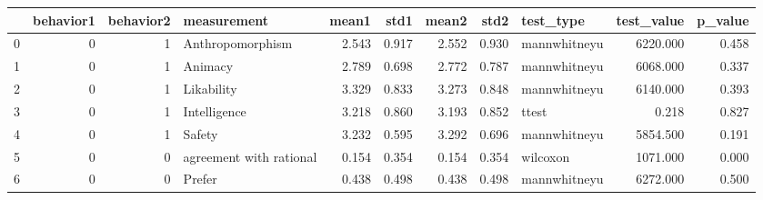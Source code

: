 \begin{tabular}{lrrlrrrrlrr}
\toprule
{} &  behavior1 &  behavior2 &              measurement &  mean1 &   std1 &  mean2 &   std2 &     test\_type &  test\_value &  p\_value \\
\midrule
0 &          0 &          1 &         Anthropomorphism &  2.543 &  0.917 &  2.552 &  0.930 &  mannwhitneyu &    6220.000 &    0.458 \\
1 &          0 &          1 &                  Animacy &  2.789 &  0.698 &  2.772 &  0.787 &  mannwhitneyu &    6068.000 &    0.337 \\
2 &          0 &          1 &               Likability &  3.329 &  0.833 &  3.273 &  0.848 &  mannwhitneyu &    6140.000 &    0.393 \\
3 &          0 &          1 &             Intelligence &  3.218 &  0.860 &  3.193 &  0.852 &         ttest &       0.218 &    0.827 \\
4 &          0 &          1 &                   Safety &  3.232 &  0.595 &  3.292 &  0.696 &  mannwhitneyu &    5854.500 &    0.191 \\
5 &          0 &          0 &  agreement with rational &  0.154 &  0.354 &  0.154 &  0.354 &      wilcoxon &    1071.000 &    0.000 \\
6 &          0 &          0 &                   Prefer &  0.438 &  0.498 &  0.438 &  0.498 &  mannwhitneyu &    6272.000 &    0.500 \\
\bottomrule
\end{tabular}
